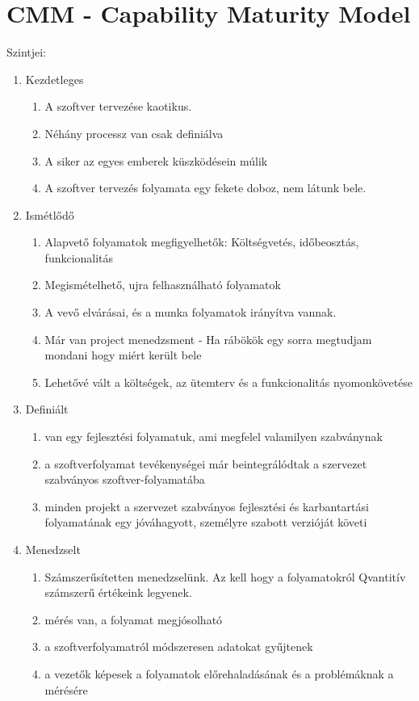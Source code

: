\section{CMM - Capability Maturity Model}

Szintjei:
\begin{enumerate}
	\item Kezdetleges
		\begin{enumerate}
			\item A szoftver tervezése kaotikus.
			\item Néhány processz van csak definiálva
			\item A siker az egyes emberek küszködésein múlik
			\item A szoftver tervezés folyamata egy fekete doboz, nem látunk bele.
		\end{enumerate}

	\item Ismétlődő
		\begin{enumerate}
			\item Alapvető folyamatok megfigyelhetők: Költségvetés, időbeosztás, funkcionalitás
			\item Megismételhető, ujra felhasználható folyamatok
			\item A vevő elvárásai, és a munka folyamatok irányítva vannak.
			\item Már van project menedzsment - Ha rábökök egy sorra megtudjam mondani hogy miért került bele
			\item Lehetővé vált a költségek, az ütemterv és a funkcionalitás nyomonkövetése
		\end{enumerate}

	\item Definiált
		\begin{enumerate}
			\item van egy fejlesztési folyamatuk, ami megfelel valamilyen szabványnak

			\item a szoftverfolyamat tevékenységei már beintegrálódtak a szervezet szabványos szoftver-folyamatába

			\item minden projekt a szervezet szabványos fejlesztési és karbantartási folyamatának egy jóváhagyott, személyre szabott verzióját követi
		\end{enumerate}

	\item Menedzselt
		\begin{enumerate}
			\item Számszerűsítetten menedzselünk. Az kell hogy a folyamatokról Qvantitív számszerű értékeink legyenek.
			\item mérés van, a folyamat megjósolható
			\item a szoftverfolyamatról módszeresen adatokat gyűjtenek
			\item a vezetők képesek a folyamatok előrehaladásának és a problémáknak a mérésére
		\end{enumerate}


\end{enumerate}
